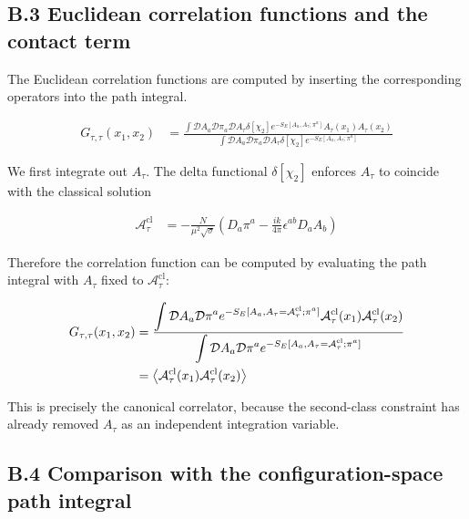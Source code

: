 \subsection{B.3 Euclidean correlation functions and the contact term}\label{subsec:fs-euclidean-contact-term}

The Euclidean correlation functions are computed by inserting the corresponding operators into the path integral.

\begin{align}
G_{\tau,\tau}(x_{1},x_{2}) & = \frac{\displaystyle{\int \mathcal{D}A_{a}\mathcal{D}\pi _{a}\mathcal{D}A_{\tau}\delta[\chi _{2}]e^{-S_{E}[A_{a},A_{\tau};\pi ^{a}]}A_{\tau}(x_{1})A_{\tau}(x_{2})}}{\displaystyle{\int\mathcal{D}A_{a}\mathcal{D}\pi _{a}\mathcal{D}A_{\tau}\delta[\chi_{2}]e^{-S_{E}[A_{a},A_{\tau};\pi ^{a}]}}}
\end{align}

We first integrate out $\displaystyle{A_{\tau}}$. The delta functional $\displaystyle{\delta [\chi_{2}]}$ enforces $A_{\tau}$ to coincide with the classical solution

\begin{align}
\mathcal{A}_{\tau}^{\mathrm{cl}} & =-\frac{N}{\mu ^{2}\sqrt{ \sigma }}\left(D_{a}\pi ^{a}-\frac{ik}{4\pi}\epsilon ^{ab}D_{a}A_{b}\right)
\end{align}

Therefore the correlation function can be computed by evaluating the path integral with $A_{\tau}$ fixed to $\mathcal{A}_{\tau}^{\mathrm{cl}}$:

\begin{align}
G_{\tau,\tau}(x_{1},x_{2}) & =\frac{\displaystyle{\int \mathcal{D}A_{a}\mathcal{D}\pi ^{a}e^{-S_{E}[A_{a},A_{\tau}=\mathcal{A}_{\tau}^{\mathrm{cl}};\pi ^{a}]}\mathcal{A}_{\tau}^{\mathrm{cl}}(x_{1})\mathcal{A}_{\tau}^{\mathrm{cl}}(x_{2})}}{\displaystyle{\int \mathcal{D}A_{a}\mathcal{D}\pi ^{a}e^{-S_{E}[A_{a},A_{\tau}=\mathcal{A}_{\tau}^{\mathrm{cl}};\pi ^{a}]}}} \\
 & = \left\langle \mathcal{A}_{\tau}^{\mathrm{cl}}(x_{1})\mathcal{A}_{\tau}^{\mathrm{cl}}(x_{2}) \right\rangle
\end{align}

This is precisely the canonical correlator, because the second-class constraint has already removed $A_{\tau}$ as an independent integration variable.

\subsection{B.4 Comparison with the configuration-space path integral}\label{subsec:fs-configuration-space-comparison}

